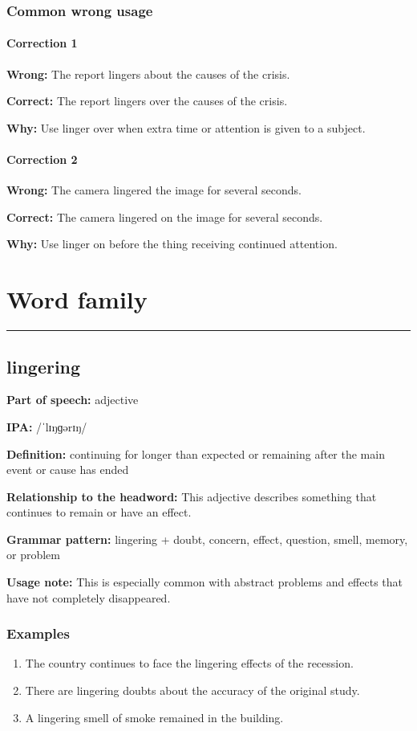 \documentclass[11pt]{article}
\newcommand{\sectionrule}{\par\vspace{-0.5em}\noindent\textcolor{Accent}{\rule{\linewidth}{0.6pt}}\par}
\begin{document}
\subsubsection{Common wrong usage}
\paragraph{Correction 1}
\textbf{Wrong:} The report lingers about the causes of the crisis.

\textbf{Correct:} The report lingers over the causes of the crisis.

\textbf{Why:} Use linger over when extra time or attention is given to a subject.

\paragraph{Correction 2}
\textbf{Wrong:} The camera lingered the image for several seconds.

\textbf{Correct:} The camera lingered on the image for several seconds.

\textbf{Why:} Use linger on before the thing receiving continued attention.

\section{Word family}
\sectionrule
\subsection{lingering}
\textbf{Part of speech:} adjective

\textbf{IPA:} /ˈlɪŋɡərɪŋ/

\textbf{Definition:} continuing for longer than expected or remaining after the main event or cause has ended

\textbf{Relationship to the headword:} This adjective describes something that continues to remain or have an effect.

\textbf{Grammar pattern:} lingering + doubt, concern, effect, question, smell, memory, or problem

\textbf{Usage note:} This is especially common with abstract problems and effects that have not completely disappeared.

\subsubsection{Examples}
\begin{enumerate}
  \item The country continues to face the lingering effects of the recession.
  \item There are lingering doubts about the accuracy of the original study.
  \item A lingering smell of smoke remained in the building.
\end{enumerate}
\end{document}
